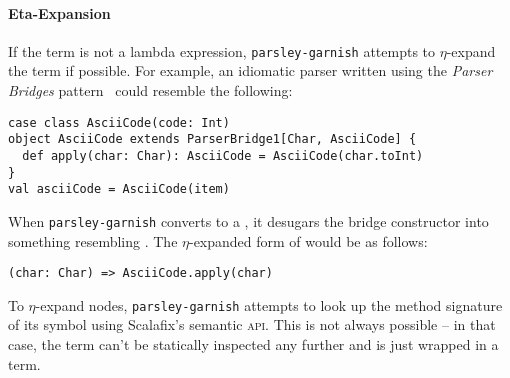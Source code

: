 \documentclass[../../../main.tex]{subfiles}
\begin{document}
\paragraph{Eta-Expansion}
If the term is not a lambda expression, \texttt{parsley-garnish} attempts to $\eta$-expand the term if possible.
For example, an idiomatic parser written using the \emph{Parser Bridges} pattern~\cite{willis_design_2022} could resemble the following:
\begin{verbatim}
case class AsciiCode(code: Int)
object AsciiCode extends ParserBridge1[Char, AsciiCode] {
  def apply(char: Char): AsciiCode = AsciiCode(char.toInt)
}
val asciiCode = AsciiCode(item)
\end{verbatim}
%
When \texttt{parsley-garnish} converts  to a , it desugars the bridge constructor into something resembling .
The $\eta$-expanded form of  would be as follows:
\begin{verbatim}
(char: Char) => AsciiCode.apply(char)
\end{verbatim}
%
To $\eta$-expand  nodes, \texttt{parsley-garnish} attempts to look up the method signature of its symbol using Scalafix's semantic \textsc{api}.
This is not always possible -- in that case, the term can't be statically inspected any further and is just wrapped in a  term.
\end{document}
